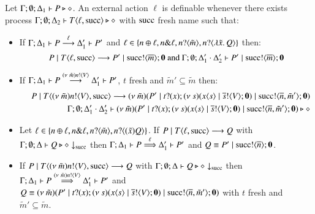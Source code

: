\begin{definition}[Definibility]\rm
	Let $\Gamma; \emptyset; \Delta_1 \vdash P \triangleright \diamond$.
	An external action $\ell$ is definable whenever
	there exists process
	$\Gamma; \emptyset; \Delta_2 \vdash T\langle \ell, \textrm{succ} \rangle \triangleright \diamond$
	with $\textrm{succ}$ fresh name %
	such that:
%
	\begin{itemize}
		\item	If $\Gamma; \Delta_1 \vdash P \stackrel{\ell}{\longrightarrow} \Delta_1' \vdash P'$ and
			$\ell \in \{n \oplus \ell, n \& \ell, n ? \langle \tilde{m} \rangle, n ? \langle \lambda \tilde{x}.\,Q \rangle\}$
			then:
%
		\[
			P \;|\; T\langle \ell, \textrm{succ} \rangle \longrightarrow P' \;|\; \textrm{succ} ! \langle \overline{m} \rangle ; \mathbf{0} \textrm{ and }
			\Gamma; \emptyset; \Delta_1' \cdot \Delta_2' \vdash P' \;|\; \textrm{succ} ! \langle \overline{m} \rangle ; \mathbf{0}
		\]
%
		\item	If $\Gamma; \Delta_1 \vdash P \stackrel{(\nu\ \tilde{m})n ! \langle V \rangle}{\longrightarrow} \Delta_1' \vdash P'$,
			$t$ fresh
			and $\tilde{m}' \subseteq \tilde{m}$
			then:
%
			\begin{eqnarray*}
				& & P \;|\; T\langle (\nu\ \tilde{m})n ! \langle V \rangle, \textrm{succ} \rangle \longrightarrow
				(\nu\ \tilde{m})(P' \;|\; t ? (x) ; (\nu\ s)(x\langle s \rangle \;|\; \overline{s} ! \langle V \rangle ; \mathbf{0}) \;|\; \textrm{succ} ! \langle \overline{n}, \tilde{m}' \rangle ; \mathbf{0})\\
				& & \Gamma; \emptyset; \Delta_1' \cdot \Delta_2' \vdash
				(\nu\ \tilde{m})(P' \;|\; t ? (x) ; (\nu\ s)(x\langle s \rangle \;|\; \overline{s} ! \langle V \rangle ; \mathbf{0}) \;|\;  \textrm{succ} ! \langle \overline{n}, \tilde{m}' \rangle ; \mathbf{0}) \triangleright \diamond\\
			\end{eqnarray*}

		\item	Let $\ell \in \{n \oplus \ell, n \& \ell, n ? \langle \tilde{m} \rangle, n ? \langle (\tilde{x}) Q \rangle\}$.
			If $P \;|\; T\langle \ell, \textrm{succ} \rangle \longrightarrow Q$ with			
			$\Gamma; \emptyset; \Delta \vdash Q \triangleright \diamond \downarrow_{\textrm{succ}}$ then 
			$\Gamma; \Delta_1 \vdash P \stackrel{\ell}{\Longrightarrow} \Delta_1' \vdash P'$
			and $Q \equiv P' \;|\; \textrm{succ} ! \langle \overline{n} \rangle ; \mathbf{0}$.

		\item	If $P \;|\; T\langle (\nu\ \tilde{m})n ! \langle V \rangle, \textrm{succ} \rangle \longrightarrow Q$
			with $\Gamma; \emptyset; \Delta \vdash Q \triangleright \diamond \downarrow_{\textrm{succ}}$ then
			$\Gamma; \Delta_1 \vdash P \stackrel{(\nu\ \tilde{m})n ! \langle V \rangle}{\Longrightarrow} \Delta_1' \vdash P'$
			and $Q \equiv (\nu\ \tilde{m})(P' \;|\; t ? (x) ; (\nu\ s)(x\langle s \rangle \;|\; \overline{s} ! \langle V \rangle ; \mathbf{0}) \;|\; \textrm{succ} ! \langle \overline{n}, \tilde{m}' \rangle ; \mathbf{0})$
			with $t$ fresh and $\tilde{m}' \subseteq \tilde{m}$.
	\end{itemize}	
%
\end{definition}

